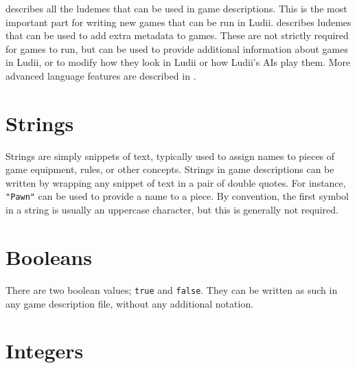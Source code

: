\documentclass[10pt,twoside]{report}
\begin{document}
 describes all the ludemes that can be used in game descriptions. This is the most important part for writing new games that can be run in Ludii.  describes ludemes that can be used to add extra metadata to games. These are not strictly required for games to run, but can be used to provide additional information about games in Ludii, or to modify how they look in Ludii or how Ludii's AIs play them. More advanced language features are described in . 

\section{Strings} \label{Sec:Introduction.Strings}

Strings are simply snippets of text, typically used to assign names to pieces of game equipment, rules, or other concepts. Strings in game descriptions can be written by wrapping any snippet of text in a pair of double quotes. For instance, \texttt{"Pawn"} can be used to provide a name to a piece. By convention, the first symbol in a string is usually an uppercase character, but this is generally not required.

\section{Booleans} \label{Sec:Introduction.Booleans}

There are two boolean values; \texttt{true} and \texttt{false}. They can be written as such in any game description file, without any additional notation.

\section{Integers} \label{Sec:Introduction.Integers}
\end{document}
